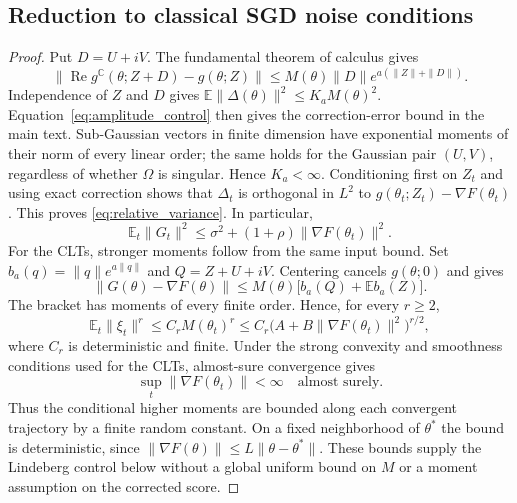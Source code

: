\subsection{Reduction to classical SGD noise conditions}
\begin{proof}
Put $D=U+iV$. The fundamental theorem of calculus gives
\[
\|\operatorname{Re}g^{\mathbb C}(\theta;Z+D)-g(\theta;Z)\|
\le M(\theta)\|D\|e^{a(\|Z\|+\|D\|)}.
\]
Independence of $Z$ and $D$ gives
$\mathbb E\|\Delta(\theta)\|^2\le K_aM(\theta)^2$.
Equation~\eqref{eq:amplitude_control} then gives the correction-error
bound in the main text.
Sub-Gaussian vectors in finite dimension have exponential moments of their
norm of every linear order; the same holds for the Gaussian pair $(U,V)$,
regardless of whether $\Omega$ is singular. Hence $K_a<\infty$.
Conditioning first on $Z_t$ and using exact correction shows that
$\Delta_t$ is orthogonal in $L^2$ to
$g(\theta_t;Z_t)-\nabla F(\theta_t)$. This proves
\eqref{eq:relative_variance}. In particular,
\begin{equation}\label{eq:score_second_moment}
\mathbb E_t\|G_t\|^2
\le\sigma^2+(1+\rho)\|\nabla F(\theta_t)\|^2.
\end{equation}
For the CLTs, stronger moments follow from the same input bound.
Set $b_a(q)=\|q\|e^{a\|q\|}$ and $Q=Z+U+iV$. Centering cancels
$g(\theta;0)$ and gives
\[
\|G(\theta)-\nabla F(\theta)\|
\le M(\theta)\bigl[b_a(Q)+\mathbb E b_a(Z)\bigr].
\]
The bracket has moments of every finite order. Hence, for every $r\ge2$,
\begin{equation}\label{eq:higher_noise_moments}
\mathbb E_t\|\xi_t\|^r\le C_r M(\theta_t)^r
\le C_r\bigl(A+B\|\nabla F(\theta_t)\|^2\bigr)^{r/2},
\end{equation}
where $C_r$ is deterministic and finite. Under the strong convexity and
smoothness conditions used for the CLTs, almost-sure convergence gives
\[
\sup_t\|\nabla F(\theta_t)\|<\infty\quad\text{almost surely}.
\]
Thus the conditional higher moments are bounded along each convergent
trajectory by a finite random constant. On a fixed neighborhood of
$\theta^*$ the bound is deterministic, since
$\|\nabla F(\theta)\|\le L\|\theta-\theta^*\|$.
These bounds supply the Lindeberg control below without a global
uniform bound on $M$ or a moment assumption on the corrected score.
\end{proof}

